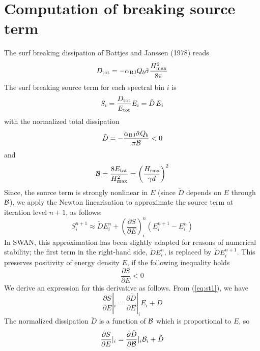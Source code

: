 \documentclass[12pt]{book}
\begin{document}
\section{Computation of breaking source term}

The surf breaking dissipation of Battjes and Janssen (1978) reads
\begin{equation}
  D_{\rm tot} = -\alpha_{\rm BJ} Q_{b} \tilde{\sigma} \frac{H^2_{\rm max}}{8\pi}
\end{equation}
The surf breaking source term for each spectral bin $i$ is
\begin{equation}
  S_{i} = \frac{D_{\rm tot}}{E_{\rm tot}} E_i = {\tilde D}\, E_i
  \label{eq:st1}
\end{equation}
with the normalized total dissipation
\begin{equation}
  {\tilde D} = -\frac{\alpha_{\rm BJ} \tilde{\sigma} Q_{b}}{\pi {\cal B}} < 0
\end{equation}
and
\begin{equation}
  {\cal B} = \frac{8E_{\rm tot}}{H^2_{\rm max}} = \left( \frac{H_{\rm rms}}{\gamma d} \right)^2
\end{equation}
Since, the source term is strongly nonlinear in $E$ (since ${\tilde D}$ depends on $E$ through ${\cal B}$), we apply the Newton linearisation
to approximate the source term at iteration level $n+1$, as follows:
\begin{equation}
   S^{n+1}_{i} \approx {\tilde D} E_i^{n} + \left( \frac{\partial S}{\partial E} \right)_i^n (E_i^{n+1} - E_i^n)
   \label{eq:newlin}
\end{equation}
In SWAN, this approximation has been slightly adapted for reasons of numerical stability; the first term in the right-hand
side, ${\tilde D} E_i^{n}$, is replaced by ${\tilde D} E_i^{n+1}$. This preserves positivity of energy density $E$, if the following
inequality holds
\begin{equation}
  \frac{\partial S}{\partial E} < 0
\end{equation}
We derive an expression for this derivative as follows. From (\ref{eq:st1}), we have
\begin{equation}
  \frac{\partial S}{\partial E} |_i = \frac{\partial {\tilde D}}{\partial E}|_i E_i + {\tilde D}
\end{equation}
The normalized dissipation ${\tilde D}$ is a function of ${\cal B}$ which is proportional to $E$, so
\begin{equation}
  \frac{\partial S}{\partial E} |_i = \frac{\partial {\tilde D}}{\partial {\cal B}}|_i {\cal B}_i + {\tilde D}
  \label{eq:st4}
\end{equation}
\end{document}

